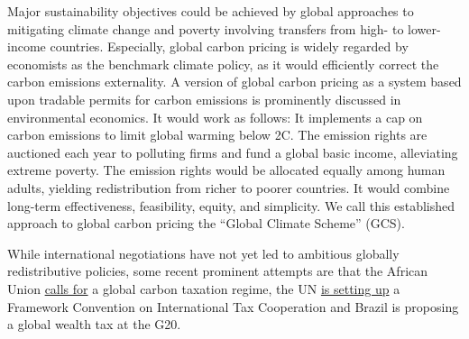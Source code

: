 \begin{bibunit}
Major sustainability objectives could be achieved by global approaches to mitigating climate change and poverty involving transfers from high- to lower-income countries.\citep{budolfson_climate_2021,franks_mobilizing_2018,dennig_inequality_2015,soergel_combining_2021,bauer_quantification_2020,cramton_global_2017} 
Especially, global carbon pricing is widely regarded by economists as the benchmark climate policy, as it would efficiently correct the carbon emissions externality. A version of global carbon pricing as a system based upon tradable permits for carbon emissions is prominently discussed in environmental economics.\citep{grubb_greenhouse_1990,hoel_carbon_1991,agarwal_global_1991,bertram_tradeable_1992,baer_equity_2000,jamieson_climate_2001,blanchard_major_2021} It would work as follows: It implements a cap on carbon emissions to limit global warming below 2\textdegree{}C. The emission rights are auctioned each year to polluting firms and fund a global basic income, alleviating extreme poverty. The emission rights would be allocated 
equally among human adults, yielding redistribution from richer to poorer countries. It would combine long-term effectiveness, feasibility, equity, and simplicity.\citep{grubb_greenhouse_1990} We call this established approach to global carbon pricing the ``Global Climate Scheme'' (GCS).


While international negotiations have not yet led to ambitious globally redistributive policies, %
some recent prominent attempts are that the %
African Union \href{https://media.africaclimatesummit.org/NAIROBI+Declaration+FURTHER+edited+060923+EN+920AM.pdf}{calls for} a global carbon taxation regime, %
the UN \href{https://digitallibrary.un.org/record/4032838}{is setting up} a Framework Convention on International Tax Cooperation and  %
Brazil is proposing  
a global wealth tax at the G20. %


\end{bibunit}
